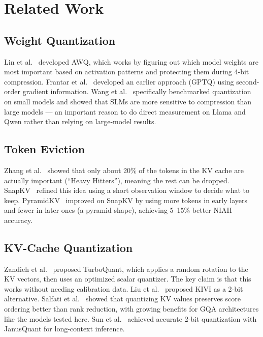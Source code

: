 \documentclass[sigconf,nonacm]{acmart}
\begin{document}
\section{Related Work}

\subsection{Weight Quantization}
Lin et al.~\cite{lin_awq_2025} developed AWQ, which works by figuring out which
model weights are most important based on activation patterns and protecting them
during 4-bit compression. Frantar et al.~\cite{frantar_gptq_2023} developed an
earlier approach (GPTQ) using second-order gradient information. Wang et
al.~\cite{wang_slmquant_2025} specifically benchmarked quantization on small
models and showed that SLMs are more sensitive to compression than large models ---
an important reason to do direct measurement on Llama and Qwen rather than
relying on large-model results.

\subsection{Token Eviction}
Zhang et al.~\cite{zhang_h2o_nodate} showed that only about 20\% of the tokens in
the KV cache are actually important (``Heavy Hitters''), meaning the rest can be
dropped. SnapKV~\cite{li_snapkv_nodate} refined this idea using a short
observation window to decide what to keep. PyramidKV~\cite{cai_pyramidkv_2025}
improved on SnapKV by using more tokens in early layers and fewer in later ones
(a pyramid shape), achieving 5--15\% better NIAH accuracy.

\subsection{KV-Cache Quantization}
Zandieh et al.~\cite{zandieh_turboquant_2025} proposed TurboQuant, which applies
a random rotation to the KV vectors, then uses an optimized scalar quantizer. The
key claim is that this works without needing calibration data. Liu et
al.~\cite{liu_kivi_2023} proposed KIVI as a 2-bit alternative. Salfati et
al.~\cite{salfati_quantization_2026} showed that quantizing KV values preserves
score ordering better than rank reduction, with growing benefits for GQA
architectures like the models tested here. Sun et al.~\cite{sun2026janusquant}
achieved accurate 2-bit quantization with JanusQuant for long-context inference.
\end{document}

